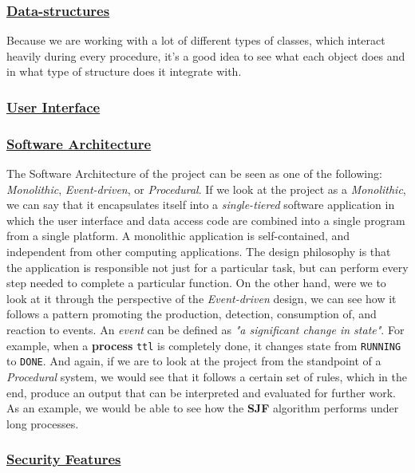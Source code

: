 \documentclass{article}
\newcommand{\code}[1]{\colorbox{codebg}{{\color{black}\texttt{#1}}}}
\begin{document}
\subsubsection{\underline{Data-structures}}

Because we are working with a lot of different types of classes, which interact heavily during every procedure, it's a good idea to see what each object does and in what type of structure does it integrate with.

\subsubsection{\underline{User Interface}}

\subsubsection{\underline{Software Architecture}}

The Software Architecture of the project can be seen as one of the following: \textit{Monolithic}, \textit{Event-driven}, or \textit{Procedural}. If we look at the project as a \textit{Monolithic}, we can say that it encapsulates itself into a \textit{single-tiered} software application in which the user interface and data access code are combined into a single program from a single platform. A monolithic application is self-contained, and independent from other computing applications. The design philosophy is that the application is responsible not just for a particular task, but can perform every step needed to complete a particular function. On the other hand, were we to look at it through the perspective of the \textit{Event-driven} design, we can see how it follows a pattern promoting the production, detection, consumption of, and reaction to events. An \textit{event} can be defined as \textit{"a significant change in state"}. For example, when a \textbf{process} \code{ttl} is completely done, it changes state from \code{RUNNING} to \code{DONE}. And again, if we are to look at the project from the standpoint of a \textit{Procedural} system, we would see that it follows a certain set of rules, which in the end, produce an output that can be interpreted and evaluated for further work. As an example, we would be able to see how the \textbf{SJF} algorithm performs under long processes.

\subsubsection{\underline{Security Features}}
\end{document}
